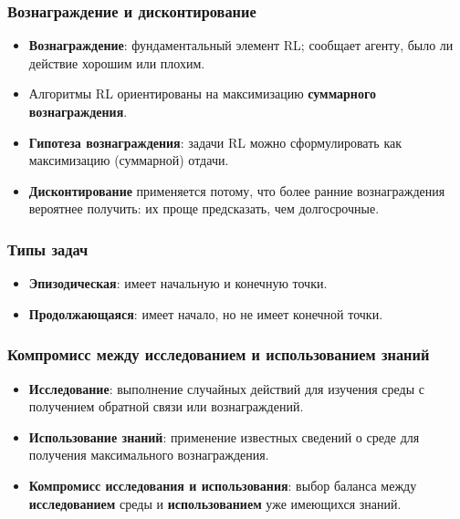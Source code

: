 \documentclass[11pt,a4paper]{article}
\begin{document}
\subsubsection{Вознаграждение и дисконтирование}\label{rewards-and-discounting}

\begin{itemize}
\tightlist
\item
  \textbf{Вознаграждение}: фундаментальный элемент RL; сообщает агенту, было ли действие хорошим или плохим.
\item
  Алгоритмы RL ориентированы на максимизацию \textbf{суммарного вознаграждения}.
\item
  \textbf{Гипотеза вознаграждения}: задачи RL можно сформулировать как максимизацию (суммарной) отдачи.
\item
  \textbf{Дисконтирование} применяется потому, что более ранние вознаграждения вероятнее получить: их проще предсказать, чем долгосрочные.
\end{itemize}

\subsubsection{Типы задач}\label{tasks}

\begin{itemize}
\tightlist
\item
  \textbf{Эпизодическая}: имеет начальную и конечную точки.
\item
  \textbf{Продолжающаяся}: имеет начало, но не имеет конечной точки.
\end{itemize}

\subsubsection{Компромисс между исследованием и использованием знаний}\label{exploration-vs-exploitation-trade-off}

\begin{itemize}
\tightlist
\item
  \textbf{Исследование}: выполнение случайных действий для изучения среды с получением обратной связи или вознаграждений.
\item
  \textbf{Использование знаний}: применение известных сведений о среде для получения максимального вознаграждения.
\item
  \textbf{Компромисс исследования и использования}: выбор баланса между \textbf{исследованием} среды и \textbf{использованием} уже имеющихся знаний.
\end{itemize}
\end{document}
